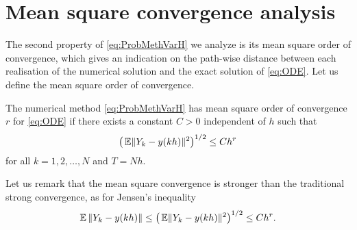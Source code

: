 \documentclass[10pt]{article}
\begin{document}
\section{Mean square convergence analysis}\label{sec:StrongOrder}

The second property of \eqref{eq:ProbMethVarH} we analyze is its mean square order of convergence, which gives an indication on the path-wise distance between each realisation of the numerical solution and the exact solution of \eqref{eq:ODE}. Let us define the mean square order of convergence. 
\begin{definition} The numerical method \eqref{eq:ProbMethVarH} has mean square order of convergence $r$ for \eqref{eq:ODE} if there exists a constant $C > 0$ independent of $h$ such that
	\begin{equation}
	\big(\operatorname{\mathbb{E}}\lVert Y_k - y(kh)\rVert^2\big)^{1/2} \leq Ch^r
	\end{equation}
	for all $k = 1, 2, \ldots, N$ and $T = Nh$.
\end{definition} 
\begin{remark} Let us remark that the mean square convergence is stronger than the traditional strong convergence, as for Jensen's inequality 
	\begin{equation}
		\operatorname{\mathbb{E}}{\lVert Y_k - y(kh)\rVert} \leq \big(\operatorname{\mathbb{E}}\lVert Y_k - y(kh)\rVert^2\big)^{1/2} \leq Ch^r.
	\end{equation}	
\end{remark}
\end{document}
